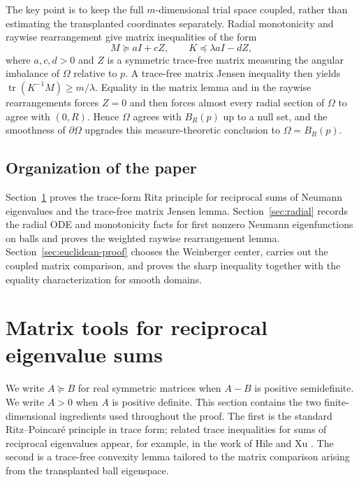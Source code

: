 \documentclass[11pt,letterpaper,reqno]{amsart}
\theoremstyle{definition}
\begin{document}
The key point is to keep the full \(m\)-dimensional trial space coupled,
rather than estimating the transplanted coordinates separately. Radial
monotonicity and raywise rearrangement give matrix inequalities of the
form
\[
        M\succeq aI+cZ,
        \qquad
        K\preceq \lambda aI-dZ,
\]
where \(a,c,d>0\) and \(Z\) is a symmetric trace-free matrix measuring the
angular imbalance of \(\Omega\) relative to \(p\). A trace-free matrix
Jensen inequality then yields $\operatorname{tr}(K^{-1}M)\ge m/\lambda$. Equality in the matrix lemma and in the raywise rearrangements forces \(Z=0\) and then forces almost every radial section of \(\Omega\) to agree with \((0,R)\). Hence \(\Omega\) agrees with \(B_R(p)\) up to a null set, and the smoothness of \(\partial\Omega\) upgrades this measure-theoretic conclusion to \(\Omega=B_R(p)\).



\subsection{Organization of the paper}
Section~\ref{sec:matrix} proves the trace-form Ritz principle for reciprocal sums of Neumann eigenvalues and the trace-free matrix Jensen lemma. Section~\ref{sec:radial} records the radial ODE and monotonicity facts for first nonzero Neumann eigenfunctions on balls and proves the weighted raywise rearrangement lemma. Section~\ref{sec:euclidean-proof} chooses the Weinberger center, carries out the coupled matrix comparison, and proves the sharp inequality together with the equality characterization for smooth domains.






\section{Matrix tools for reciprocal eigenvalue sums}\label{sec:matrix}

We write \(A\succeq B\) for real symmetric matrices when \(A-B\) is
positive semidefinite. We write \(A>0\) when \(A\) is positive definite.
This section contains the two finite-dimensional ingredients used
throughout the proof. The first is the standard Ritz--Poincar\'e principle
in trace form; related trace inequalities for sums of reciprocal
eigenvalues appear, for example, in the work of Hile and Xu \cite{HX93}.
The second is a trace-free convexity lemma tailored to the matrix
comparison arising from the transplanted ball eigenspace.
\end{document}
